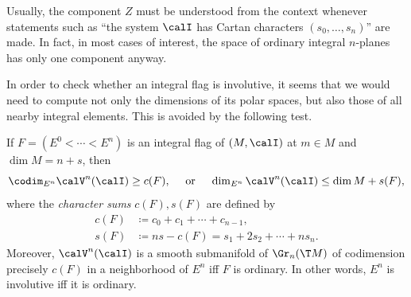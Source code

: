 Usually, the component $Z$ must be understood from the context whenever statements such as ``the system $\calI$ has Cartan characters $(s_0,\ldots,s_n)$'' are made. In fact, in most cases of interest, the space of ordinary integral $n$-planes has only one component anyway.

In order to check whether an integral flag is involutive, it seems that we would need to compute not only the dimensions of its polar spaces, but also those of all nearby integral elements. This is avoided by the following test.


\begin{thm}\label{thm cartan's test}
    If $F=(E^0<\cdots<E^n)$ is an integral flag of $(M,\calI)$ at $m\in M$ and $\dim M=n+s$, then 
    \[\codim_{E^n}\calV^n(\calI)\geq c(F), \quad\text{ or } \quad\dim_{E^n}\calV^n(\calI)\leq \dim M+s(F),\]
    where the \emph{character sums} $c(F),s(F)$ are defined by 
    \begin{align}
        c(F)&\coloneqq  c_0+c_1+\cdots+c_{n-1},\\
        s(F)&\coloneqq ns-c(F)=s_1+2s_2+\cdots+ns_n.
    \end{align}
    Moreover, $\calV^n(\calI)$ is a smooth submanifold of $\Gr_n (\T M)$ of codimension precisely $c(F)$ in a neighborhood of $E^n$ iff $F$ is ordinary. In other words, $E^n$ is involutive iff it is ordinary.
\end{thm}
